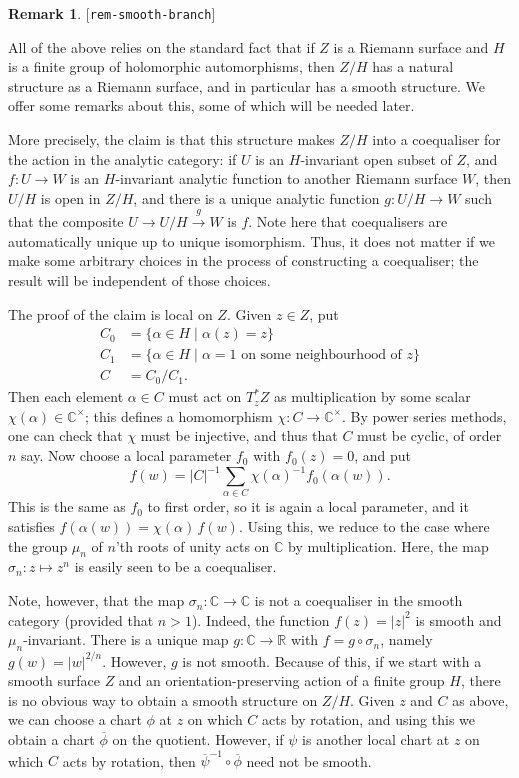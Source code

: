 \documentclass[reqno]{amsart}
\newcommand{\lbl}[1]{\label{#1}\textup{[\texttt{#1}]}\par}
\newcommand{\lbl}{\label}
\newcommand{\al}        {\alpha}
\newcommand{\sg}        {\sigma}
\newcommand{\xra}       {\xrightarrow}
\newcommand{\R}         {{\mathbb{R}}}
\newcommand{\C}         {{\mathbb{C}}}
\newcommand{\ov}[1]     {\overline{#1}}
\newcommand{\st}        {\;|\;}
\newcommand{\tm}        {\times}
\renewcommand{\:}{\colon}
\theoremstyle{definition}
\newtheorem{remark}[theorem]{Remark}
\begin{document}
\begin{remark}\lbl{rem-smooth-branch}
 All of the above relies on the standard fact that if $Z$ is a Riemann
 surface and $H$ is a finite group of holomorphic automorphisms, then
 $Z/H$ has a natural structure as a Riemann surface, and in particular
 has a smooth structure.  We offer some remarks about this, some of
 which will be needed later.

 More precisely, the claim is that this structure makes $Z/H$ into a
 coequaliser for the action in the analytic category: if $U$ is an
 $H$-invariant open subset of $Z$, and $f\:U\to W$ is an $H$-invariant
 analytic function to another Riemann surface $W$, then $U/H$ is open
 in $Z/H$, and there is a unique analytic function $g\:U/H\to W$ such
 that the composite $U\to U/H\xra{g}W$ is $f$.  Note here that
 coequalisers are automatically unique up to unique isomorphism.
 Thus, it does not matter if we make some arbitrary choices in the
 process of constructing a coequaliser; the result will be independent
 of those choices.

 The proof of the claim is local on $Z$.  Given $z\in Z$, put
 \begin{align*}
  C_0 &= \{\al\in H\st \al(z)=z\} \\
  C_1 &= \{\al\in H\st \al=1 \text{ on some neighbourhood of } z\} \\
  C &= C_0/C_1.
 \end{align*}
 Then each element $\al\in C$ must act
 on $T^*_zZ$ as multiplication by some scalar $\chi(\al)\in\C^\tm$;
 this defines a homomorphism $\chi\:C\to\C^\tm$.  By power series
 methods, one can check that $\chi$ must be injective, and thus that
 $C$ must be cyclic, of order $n$ say.  Now choose a local parameter
 $f_0$ with $f_0(z)=0$, and put
 \[ f(w) = |C|^{-1}\sum_{\al\in C}\chi(\al)^{-1}f_0(\al(w)). \]
 This is the same as $f_0$ to first order, so it is again a local
 parameter, and it satisfies $f(\al(w))=\chi(\al)\,f(w)$.  Using this,
 we reduce to the case where the group $\mu_n$ of $n$'th roots of
 unity acts on $\C$ by multiplication.  Here, the map
 $\sg_n\:z\mapsto z^n$ is easily seen to be a coequaliser.

 Note, however, that the map $\sg_n\:\C\to\C$ is not a coequaliser in
 the smooth category (provided that $n>1$).  Indeed, the function
 $f(z)=|z|^2$ is smooth and $\mu_n$-invariant.  There is a unique map
 $g\:\C\to\R$ with $f=g\circ\sg_n$, namely $g(w)=|w|^{2/n}$.  However,
 $g$ is not smooth.  Because of this, if we start with a smooth
 surface $Z$ and an orientation-preserving action of a finite group
 $H$, there is no obvious way to obtain a smooth structure on $Z/H$.
 Given $z$ and $C$ as above, we can choose a chart $\phi$ at $z$ on
 which $C$ acts by rotation, and using this we obtain a chart
 $\ov{\phi}$ on the quotient.  However, if $\psi$ is another local
 chart at $z$ on which $C$ acts by rotation, then
 $\ov{\psi}^{-1}\circ\ov{\phi}$ need not be smooth.


\end{remark}
\end{document}
